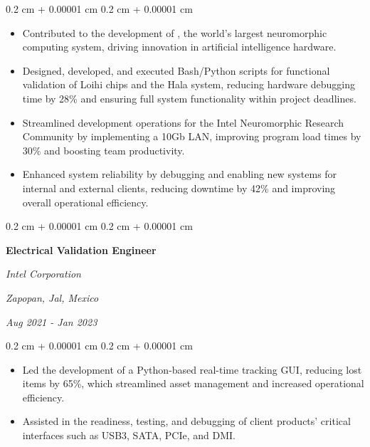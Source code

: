 \documentclass[10pt, letterpaper]{article}
\newenvironment{highlights}{
    \begin{itemize}[
        topsep=0.10 cm,
        parsep=0.10 cm,
        partopsep=0pt,
        itemsep=0pt,
        leftmargin=0.4 cm + 10pt
    ]
}{
    \end{itemize}
} %
\newenvironment{onecolentry}{
    \begin{adjustwidth}{
        0.2 cm + 0.00001 cm
    }{
        0.2 cm + 0.00001 cm
    }
}{
    \end{adjustwidth}
} %
\newenvironment{twocolentry}[2][]{
    \onecolentry
    \def\secondColumn{#2}
    \setcolumnwidth{\fill, 4.5 cm}
    \begin{paracol}{2}
}{
    \switchcolumn \raggedleft \secondColumn
    \end{paracol}
    \endonecolentry
} %
\let\hrefWithoutArrow\href
\renewcommand{\href}[2]{\hrefWithoutArrow{#1}{\ifthenelse{\equal{#2}{}}{ }{#2 }\raisebox{.15ex}{\footnotesize \faExternalLink*}}}
\begin{document}
        \vspace{0.10 cm}
        \begin{onecolentry}
            \begin{highlights}
                \item Contributed to the development of \href{https://newsroom.intel.com/artificial-intelligence/intel-builds-worlds-largest-neuromorphic-system-to-enable-more-sustainable-ai}{Hala Point}, the world’s largest neuromorphic computing system, driving innovation in artificial intelligence hardware.
                \item Designed, developed, and executed Bash/Python scripts for functional validation of Loihi chips and the Hala system, reducing hardware debugging time by 28\% and ensuring full system functionality within project deadlines.
                \item Streamlined development operations for the Intel Neuromorphic Research Community by implementing a 10Gb LAN, improving program load times by 30\% and boosting team productivity.
                \item Enhanced system reliability by debugging and enabling new systems for internal and external clients, reducing downtime by 42\% and improving overall operational efficiency.
            \end{highlights}
        \end{onecolentry}


        \vspace{0.2 cm}

        \begin{twocolentry}{
        \textit{Zapopan, Jal, Mexico}    
            
        \textit{Aug 2021 - Jan 2023}}
            \textbf{Electrical Validation Engineer}
            
            \textit{Intel Corporation}
        \end{twocolentry}

        \vspace{0.10 cm}
        \begin{onecolentry}
            \begin{highlights}
                \item Led the development of a Python-based real-time tracking GUI, reducing lost items by 65\%, which streamlined asset management and increased operational efficiency.
                \item Assisted in the readiness, testing, and debugging of client products' critical interfaces such as USB3, SATA, PCIe, and DMI.
            \end{highlights}
        \end{onecolentry}
\end{document}
